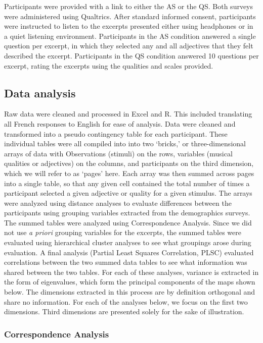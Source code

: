 \documentclass[
  english,
  man]{apa6}
\begin{document}
Participants were provided with a link to either the AS or the QS. Both surveys were administered using Qualtrics. After standard informed consent, participants were instructed to listen to the excerpts presented either using headphones or in a quiet listening environment. Participants in the AS condition answered a single question per excerpt, in which they selected any and all adjectives that they felt described the excerpt. Participants in the QS condition answered 10 questions per excerpt, rating the excerpts using the qualities and scales provided.

\hypertarget{data-analysis}{%
\subsection{Data analysis}\label{data-analysis}}

Raw data were cleaned and processed in Excel and R. This included translating all French responses to English for ease of analysis. Data were cleaned and transformed into a pseudo contingency table for each participant. These individual tables were all compiled into into two `bricks,' or three-dimensional arrays of data with Observations (stimuli) on the rows, variables (musical qualities or adjectives) on the columns, and participants on the third dimension, which we will refer to as `pages' here. Each array was then summed across pages into a single table, so that any given cell contained the total number of times a participant selected a given adjective or quality for a given stimulus.
The arrays were analyzed using distance analyses to evaluate differences between the participants using grouping variables extracted from the demographics surveys. The summed tables were analyzed using Correspondence Analysis. Since we did not use \emph{a priori} grouping variables for the excerpts, the summed tables were evaluated using hierarchical cluster analyses to see what groupings arose during evaluation.
A final analysis (Partial Least Squares Correlation, PLSC) evaluated correlations between the two summed data tables to see what information was shared between the two tables.
For each of these analyses, variance is extracted in the form of eigenvalues, which form the principal components of the maps shown below. The dimensions extracted in this process are by definition orthogonal and share no information. For each of the analyses below, we focus on the first two dimensions. Third dimensions are presented solely for the sake of illustration.

\hypertarget{correspondence-analysis}{%
\subsubsection{Correspondence Analysis}\label{correspondence-analysis}}
\end{document}
